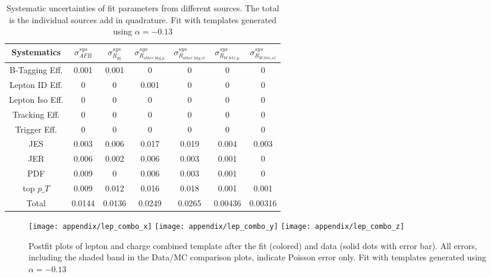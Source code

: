 \documentclass{cmspaperpdf}
\begin{document}
\begin{table}[htb]
\centering
\begin{tabular}{c|cc|cccc}
Systematics &    $\sigma_{AFB}^{sys}$ & $\sigma_{R_{q\bar{q}}}^{sys}$ & $\sigma_{R_{other\_bkg\_\mu}}^{sys}$ & $\sigma_{R_{other\_bkg\_el}}^{sys}$ & $\sigma_{R_{WJets\_\mu}}^{sys}$ & $\sigma_{R_{WJets\_el}}^{sys}$  \\
\hline
B-Tagging Eff.  &   0.001 &    0.001 &                  0 &                  0 &              0 &              0 \\
Lepton ID Eff.  &       0 &        0 &              0.001 &                  0 &              0 &              0 \\
Lepton Iso Eff. &       0 &        0 &                  0 &                  0 &              0 &              0 \\
Tracking Eff.   &       0 &        0 &                  0 &                  0 &              0 &              0 \\
Trigger Eff.    &       0 &        0 &                  0 &                  0 &              0 &              0 \\
JES             &   0.003 &    0.006 &              0.017 &              0.019 &          0.004 &          0.003 \\
JER             &   0.006 &    0.002 &              0.006 &              0.003 &          0.001 &              0 \\
PDF             &   0.009 &        0 &              0.006 &              0.003 &          0.001 &              0 \\
top $p\_T$         &   0.009 &    0.012 &              0.016 &              0.018 &          0.001 &          0.001 \\
\hline
Total           &  0.0144 &   0.0136 &             0.0249 &             0.0265 &        0.00436 &        0.00316 \\
\hline
\end{tabular}
\caption{Systematic uncertainties of fit parameters from different sources. The total is the individual sources add in quadrature. Fit with templates generated using $\alpha=-0.13$ }
\label{tab:sys-err-old-alpha}
\end{table}


\begin{figure}[hbt]
  \begin{center}
    \texttt{[image: appendix/lep\_combo\_x]}
    \texttt{[image: appendix/lep\_combo\_y]}
    \texttt{[image: appendix/lep\_combo\_z]}
  \caption{\small Postfit plots of lepton and charge combined template after the fit (colored) and data (solid dots with error bar). All errors, including the shaded band in the Data/MC comparison plots, indicate Poisson error only. Fit with templates generated using $\alpha=-0.13$}
    \label{fig:postfit combined old alpha}
  \end{center}
\end{figure}
\end{document}

